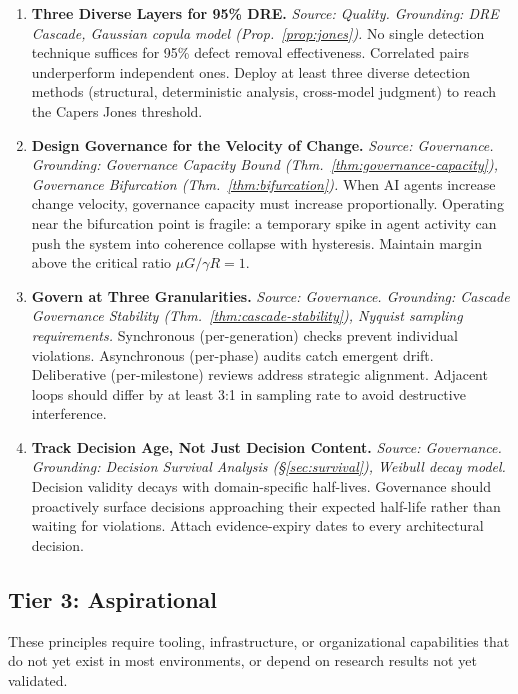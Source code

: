 \documentclass[11pt, a4paper, logo, copyright]{googledeepmind}
\begin{document}
\begin{enumerate}[label=\textbf{P\arabic*.}, leftmargin=3em, resume]
\item \textbf{Three Diverse Layers for 95\% DRE.}
\emph{Source: Quality. Grounding: DRE Cascade, Gaussian copula model (Prop.~\ref{prop:jones}).}
No single detection technique suffices for 95\% defect removal effectiveness. Correlated pairs underperform independent ones. Deploy at least three diverse detection methods (structural, deterministic analysis, cross-model judgment) to reach the Capers Jones threshold.

\item \textbf{Design Governance for the Velocity of Change.}
\emph{Source: Governance. Grounding: Governance Capacity Bound (Thm.~\ref{thm:governance-capacity}), Governance Bifurcation (Thm.~\ref{thm:bifurcation}).}
When AI agents increase change velocity, governance capacity must increase proportionally. Operating near the bifurcation point is fragile: a temporary spike in agent activity can push the system into coherence collapse with hysteresis. Maintain margin above the critical ratio $\mu G / \gamma R = 1$.

\item \textbf{Govern at Three Granularities.}
\emph{Source: Governance. Grounding: Cascade Governance Stability (Thm.~\ref{thm:cascade-stability}), Nyquist sampling requirements.}
Synchronous (per-generation) checks prevent individual violations. Asynchronous (per-phase) audits catch emergent drift. Deliberative (per-milestone) reviews address strategic alignment. Adjacent loops should differ by at least 3:1 in sampling rate to avoid destructive interference.

\item \textbf{Track Decision Age, Not Just Decision Content.}
\emph{Source: Governance. Grounding: Decision Survival Analysis (\S\ref{sec:survival}), Weibull decay model.}
Decision validity decays with domain-specific half-lives. Governance should proactively surface decisions approaching their expected half-life rather than waiting for violations. Attach evidence-expiry dates to every architectural decision.

\end{enumerate}

\subsection{Tier 3: Aspirational}
\label{sec:tier3}

These principles require tooling, infrastructure, or organizational capabilities that do not yet exist in most environments, or depend on research results not yet validated.
\end{document}
